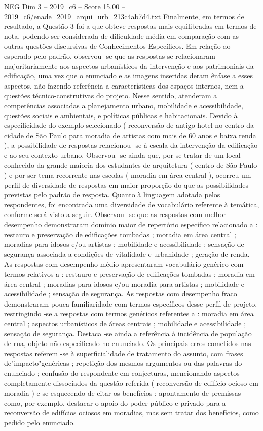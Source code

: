 \begin{textsample}{NEG Dim 3 – 2019\_c6 – Score 15.00 – 2019\_c6/enade\_2019\_arqui\_urb\_213c4ab7d4.txt}
Finalmente, em termos de resultado, a Questão 3 foi a que obteve respostas mais equilibradas em termos de nota, podendo ser considerada de dificuldade média em comparação com as outras questões discursivas de Conhecimentos Específicos.
Em relação ao esperado pelo padrão, observou -se que as respostas se relacionaram majoritariamente aos aspectos urbanísticos da intervenção e aos patrimoniais da edificação, uma vez que o enunciado e as imagens inseridas deram ênfase a esses aspectos, não fazendo referência a características dos espaços internos, nem a questões técnico-construtivas do projeto.
Nesse sentido, atenderam a competências associadas a planejamento urbano, mobilidade e acessibilidade, questões sociais e ambientais, e políticas públicas e habitacionais.
Devido à especificidade do exemplo selecionado ( reconversão de antigo hotel no centro da cidade de São Paulo para moradia de artistas com mais de 60 anos e baixa renda ), a possibilidade de respostas relacionou -se à escala da intervenção da edificação e ao seu contexto urbano.
Observou -se ainda que, por se tratar de um local conhecido da grande maioria dos estudantes de arquitetura ( centro de São Paulo ) e por ser tema recorrente nas escolas ( moradia em área central ), ocorreu um perfil de diversidade de respostas em maior proporção do que as possibilidades previstas pelo padrão de resposta.
Quanto à linguagem adotada pelos respondentes, foi encontrada uma diversidade de vocabulário referente à temática, conforme será visto a seguir.
Observou -se que as respostas com melhor desempenho demonstraram domínio maior de repertório específico relacionado a : restauro e preservação de edificações tombadas ; moradia em área central ; moradias para idosos e/ou artistas ; mobilidade e acessibilidade ; sensação de segurança associada a condições de vitalidade e urbanidade ; geração de renda.
As respostas com desempenho médio apresentaram vocabulário genérico com termos relativos a : restauro e preservação de edificações tombadas ; moradia em área central ; moradias para idosos e/ou moradia para artistas ; mobilidade e acessibilidade ; sensação de segurança.
As respostas com desempenho fraco demonstraram pouca familiaridade com termos específicos desse perfil de projeto, restringindo -se a respostas com termos genéricos referentes a : moradia em área central ; aspectos urbanísticos de áreas centrais ; mobilidade e acessibilidade ; sensação de segurança.
Destaca -se ainda a referência à incidência de população de rua, objeto não especificado no enunciado.
Os principais erros cometidos nas respostas referem -se à superficialidade de tratamento do assunto, com frases de"impacto"genéricas ; repetição dos mesmos argumentos ou das palavras do enunciado ; confusão do respondente em conjecturas, mencionando aspectos completamente dissociados da questão referida ( reconversão de edifício ocioso em moradia ) e se esquecendo de citar os benefícios ; apontamento de premissas como, por exemplo, destacar o apoio do poder público e privado para a reconversão de edifícios ociosos em moradias, mas sem tratar dos benefícios, como pedido pelo enunciado.

\end{textsample}
